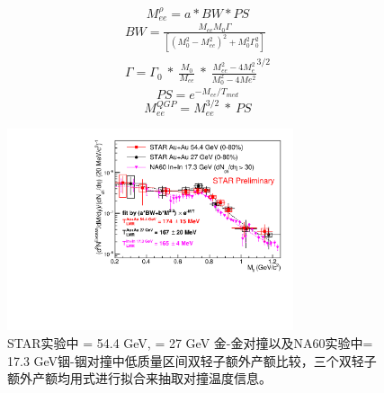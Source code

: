 \begin{equation}
    \label{eq:rho_spectra}
    M_{ee}^{\rho} = a*BW*PS
\end{equation}
\begin{equation}
    \label{eq:BW}
    \begin{split}
        BW =\frac{M_{ee}M_{0}\Gamma}{[(M_0^2-M_{ee}^2)^2+M_0^2\Gamma_0^2]}\\
        \Gamma = \Gamma_0~*~\frac{M_0}{M_{ee}}~*~\frac{M^2_{ee}-4M_e^2}{M_0^2-4Me^2}^{3/2}
    \end{split}
\end{equation}
\begin{equation}
    \label{eq:PS}
    PS = e^{-M_{ee}/T_{med}}
\end{equation}
\begin{equation}
    \label{eq:QGP_thermal}
    M_{ee}^{QGP} = M_{ee}^{3/2}~*~PS
\end{equation}

\begin{figure}[htb]
    \begin{center}
    \includegraphics[width=0.75\textwidth,clip]{figures/Chapter4/Hm_ExY_LMR_54GeV_27GeV_NA60_RhoAndQGPfit_icent0.pdf}
    \end{center}
    \caption[STAR实验中 \sNN = 54.4 GeV, \sNN = 27 GeV 金-金对撞以及NA60实验中\sNN = 17.3 GeV铟-铟对撞低质量区间双轻子额外产额谱比较示意图]{STAR实验中 \sNN = 54.4 GeV, \sNN = 27 GeV 金-金对撞以及NA60实验中\sNN = 17.3 GeV铟-铟对撞中低质量区间双轻子额外产额比较，三个双轻子额外产额均用式进行拟合来抽取对撞温度信息。}
    \label{fig:Hm_ExY_LMR_54GeV_27GeV_NA60_RhoAndQGPfit_icent0}
\end{figure}

